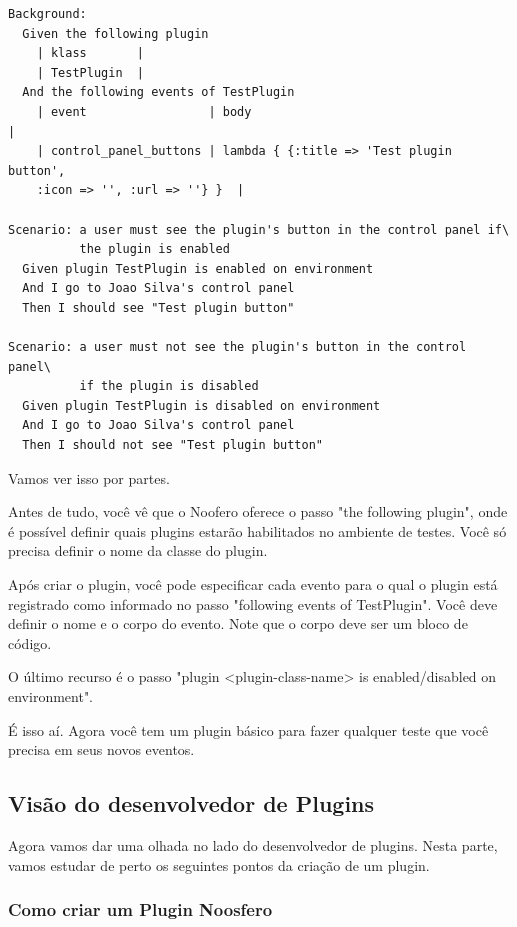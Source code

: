 \documentclass[11pt]{article}
\begin{document}
\begin{Verbatim}[frame=single,fontfamily=courier]
Background:
  Given the following plugin
    | klass       |
    | TestPlugin  |
  And the following events of TestPlugin
    | event                 | body                                                                  |
    | control_panel_buttons | lambda { {:title => 'Test plugin button',
    :icon => '', :url => ''} }  |
 
Scenario: a user must see the plugin's button in the control panel if\
          the plugin is enabled
  Given plugin TestPlugin is enabled on environment
  And I go to Joao Silva's control panel
  Then I should see "Test plugin button"
 
Scenario: a user must not see the plugin's button in the control panel\
          if the plugin is disabled
  Given plugin TestPlugin is disabled on environment
  And I go to Joao Silva's control panel
  Then I should not see "Test plugin button"
\end{Verbatim}

Vamos ver isso por partes.

Antes de tudo, você vê que o Noofero oferece o passo "the following plugin",
onde é possível definir quais plugins estarão habilitados no ambiente de
testes. Você só precisa definir o nome da classe do plugin.

Após criar o plugin, você pode especificar cada evento para o qual o plugin
está registrado como informado no passo "following events of TestPlugin". Você
deve definir o nome e o corpo do evento. Note que o corpo deve ser um bloco
de código.

O último recurso é o passo "plugin <plugin-class-name> is enabled/disabled on
environment".

É isso aí. Agora você tem um plugin básico para fazer qualquer teste que você
precisa em seus novos eventos.

\subsection{Visão do desenvolvedor de Plugins}

Agora vamos dar uma olhada no lado do desenvolvedor de plugins. Nesta parte,
vamos estudar de perto os seguintes pontos da criação de um plugin.

\subsubsection{Como criar um Plugin Noosfero}
\end{document}
